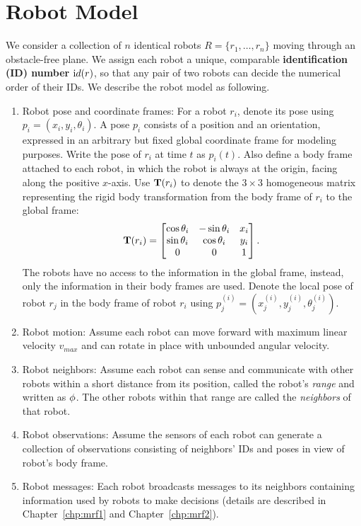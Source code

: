 \section{Robot Model}
\label{sec:robot-model}
We consider a collection of $n$ identical robots $R = \{r_1, \ldots, r_n \}$ moving through an obstacle-free plane. 
%
We assign each robot a unique, comparable \textbf{identification (ID) number} ${\textrm id}(r)$, 
so that any pair of two robots can decide the numerical order of their IDs.
%
We describe the robot model as following.
\begin{enumerate}
\item Robot pose and coordinate frames: For a robot $r_i$, denote its pose using
  $p_i = (x_i, y_i, \theta_i)$. A pose $p_i$ consists of a position and an
  orientation, expressed in an arbitrary but fixed global coordinate frame for
  modeling purposes. Write the pose of $r_i$ at time $t$ as $p_i(t)$.  Also
  define a body frame attached to each robot, in which the robot is always at
  the origin, facing along the positive $x$-axis. Use $\mathbf{T}(r_i)$ to denote the $3
  \times 3$ homogeneous matrix representing the rigid body transformation from
  the body frame of $r_i$ to the global frame:
  \begin{equation}
    \label{eq:trans}
    \mathbf{T}(r_i) =  \begin{bmatrix}
      \cos{\theta_i} & - \sin{\theta_i} & x_i\\
      \sin{\theta_i} & \cos{\theta_i} & y_i \\
      0 & 0 & 1\\
    \end{bmatrix}.
  \end{equation}
  The robots have no access to the information in the global frame,
  instead, only the information in their body frames are used. 
  Denote the local pose of robot $r_j$ in the body frame of robot $r_i$ using
  $p_j^{(i)} = (x_j^{(i)}, y_j^{(i)}, \theta_j^{(i)})$.
\item Robot motion: Assume each robot can move forward with maximum
  linear velocity $v_{max}$ and can rotate in place with unbounded
  angular velocity.
\item Robot neighbors: Assume each robot can sense and
  communicate with other robots within a short distance from its
  position, called the robot's \textit{range} and written as $\phi$.
  The other robots within that range are called the \textit{neighbors}
  of that robot.
\item Robot observations: Assume the sensors of each robot can generate
  a collection of observations consisting of neighbors' IDs and poses
  in view of robot's body frame.
\item Robot messages: Each robot broadcasts messages to its neighbors
  containing information used by robots to make decisions (details are
  described in Chapter~\ref{chp:mrf1} and Chapter~\ref{chp:mrf2}). 
\end{enumerate}

